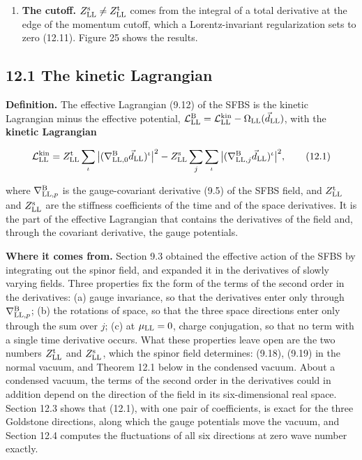 \documentclass[
  10pt,
]{article}
\begin{document}
\begin{enumerate}
  six fields of SFBSv the masses 0 (the three Goldstone fields) and
  \(2\Delta^{\rm vac}_{\rm LL}=0.418987\) (the amplitude field and the
  two non-unitary fields) (12.9): the exact poles, below the
  pair-breaking threshold \(2M^{\rm q}_{\rm LL}=0.579267\). The
  time-dependent mean-field equations show the oscillation of the gap at
  \(2\Delta^{\rm vac}_{\rm LL}\), undamped. Check SB-16.
\item
  \textbf{The cutoff.} \(Z^{\rm s}_{\rm LL}\neq Z^{\rm t}_{\rm LL}\)
  comes from the integral of a total derivative at the edge of the
  momentum cutoff, which a Lorentz-invariant regularization sets to zero
  (12.11). Figure 25 shows the results.
\end{enumerate}

\hypertarget{the-kinetic-lagrangian}{%
\subsection{12.1 The kinetic Lagrangian}\label{the-kinetic-lagrangian}}

\textbf{Definition.} The effective Lagrangian (9.12) of the SFBS is the
kinetic Lagrangian minus the effective potential,
\(\mathcal L^{\rm B}_{\rm LL}=\mathcal L^{\rm kin}_{\rm LL}-\Omega_{\rm LL}(\vec d_{\rm LL})\),
with the \textbf{kinetic Lagrangian}

\[\mathcal L^{\rm kin}_{\rm LL}=Z^{\rm t}_{\rm LL}\sum_\iota\big\lvert(\nabla^{\rm B}_{{\rm LL},0}\vec d_{\rm LL})^\iota\big\rvert^2-Z^{\rm s}_{\rm LL}\sum_j\sum_\iota\big\lvert(\nabla^{\rm B}_{{\rm LL},j}\vec d_{\rm LL})^\iota\big\rvert^2,\tag{12.1}\]

where \(\nabla^{\rm B}_{{\rm LL},p}\) is the gauge-covariant derivative
(9.5) of the SFBS field, and \(Z^{\rm t}_{\rm LL}\) and
\(Z^{\rm s}_{\rm LL}\) are the stiffness coefficients of the time and of
the space derivatives. It is the part of the effective Lagrangian that
contains the derivatives of the field and, through the covariant
derivative, the gauge potentials.

\textbf{Where it comes from.} Section 9.3 obtained the effective action
of the SFBS by integrating out the spinor field, and expanded it in the
derivatives of slowly varying fields. Three properties fix the form of
the terms of the second order in the derivatives: (a) gauge invariance,
so that the derivatives enter only through
\(\nabla^{\rm B}_{{\rm LL},p}\); (b) the rotations of space, so that the
three space directions enter only through the sum over \(j\); (c) at
\(\mu_{\rm LL}=0\), charge conjugation, so that no term with a single
time derivative occurs. What these properties leave open are the two
numbers \(Z^{\rm t}_{\rm LL}\) and \(Z^{\rm s}_{\rm LL}\), which the
spinor field determines: (9.18), (9.19) in the normal vacuum, and
Theorem 12.1 below in the condensed vacuum. About a condensed vacuum,
the terms of the second order in the derivatives could in addition
depend on the direction of the field in its six-dimensional real space.
Section 12.3 shows that (12.1), with one pair of coefficients, is exact
for the three Goldstone directions, along which the gauge potentials
move the vacuum, and Section 12.4 computes the fluctuations of all six
directions at zero wave number exactly.
\end{document}
